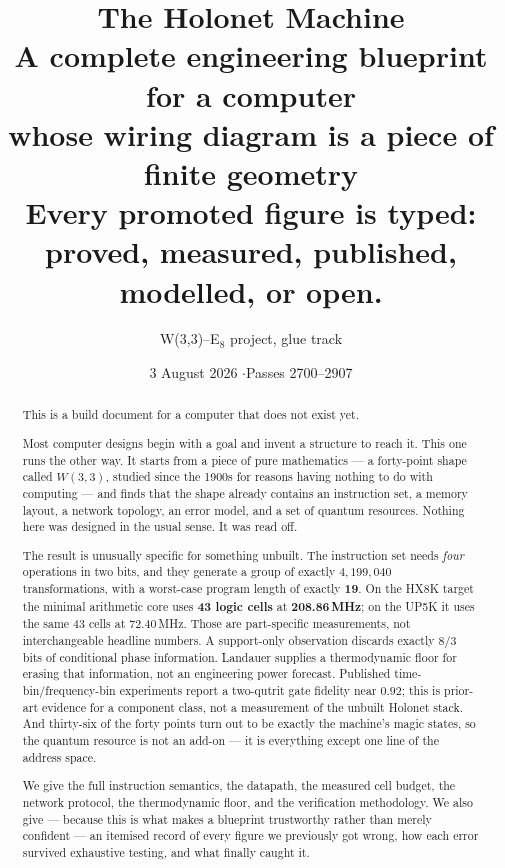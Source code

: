 \documentclass[11pt,a4paper]{article}
\title{\vspace{-1.4cm}\Huge The Holonet Machine\\[4pt]
       \large A complete engineering blueprint for a computer\\
       whose wiring diagram is a piece of finite geometry\\[10pt]
       \normalsize Every promoted figure is typed: proved, measured, published, modelled, or open.}
\author{\normalsize W(3,3)--E$_8$ project, glue track}
\date{\normalsize 3 August 2026 \quad$\cdot$\quad Passes 2700--2907}
\begin{document}
\maketitle
\thispagestyle{fancy}

\begin{abstract}
\noindent
This is a build document for a computer that does not exist yet.

\smallskip\noindent
Most computer designs begin with a goal and invent a structure to reach it. This one runs
the other way. It starts from a piece of pure mathematics --- a forty-point shape called
$W(3,3)$, studied since the 1900s for reasons having nothing to do with computing --- and
finds that the shape already contains an instruction set, a memory layout, a network
topology, an error model, and a set of quantum resources. Nothing here was designed in the
usual sense. It was read off.

\smallskip\noindent
The result is unusually specific for something unbuilt. The instruction set needs
\emph{four} operations in two bits, and they generate a group of exactly $4{,}199{,}040$
transformations, with a worst-case program length of exactly \textbf{19}. On the HX8K target the minimal arithmetic core uses \textbf{43 logic cells} at
\textbf{208.86\,MHz}; on the UP5K it uses the same 43 cells at 72.40\,MHz.  Those are
part-specific measurements, not interchangeable headline numbers. A support-only observation discards exactly $8/3$ bits of conditional phase
information.  Landauer supplies a thermodynamic floor for erasing that information, not
an engineering power forecast. Published time-bin/frequency-bin experiments report a two-qutrit gate fidelity near
$0.92$; this is prior-art evidence for a component class, not a measurement of the
unbuilt Holonet stack. And thirty-six of
the forty points turn out to be exactly the machine's magic states, so the quantum
resource is not an add-on --- it is everything except one line of the address space.

\smallskip\noindent
We give the full instruction semantics, the datapath, the measured cell budget, the
network protocol, the thermodynamic floor, and the verification methodology. We also give
--- because this is what makes a blueprint trustworthy rather than merely confident ---
an itemised record of every figure we previously got wrong, how each error survived
exhaustive testing, and what finally caught it.
\end{abstract}

\vspace{-4mm}
\tableofcontents
\newpage
\end{document}
